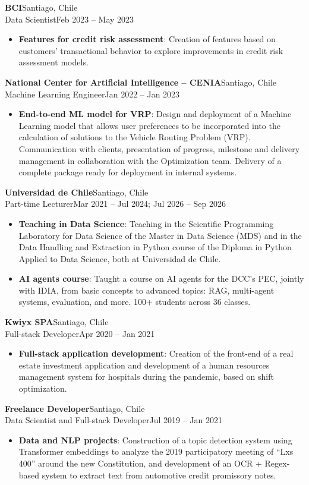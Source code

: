 \documentclass[letterpaper,11pt]{article}
\newcommand{\resumeItem}[2]{
  \item\small{
    \textbf{#1}{: #2\vspace{-2pt}}
  }
}
\newcommand{\resumeSubheading}[4]{%
  \Needspace{7\baselineskip}\vspace{-1pt}\item[]%
    \textbf{#1}\hfill{\small\color{meta}#2}\\[1pt]
    {\small #3}\hfill{\small\color{meta}#4}\vspace{-5pt}%
}
\newcommand{\resumeItemListStart}{\begin{itemize}}
\newcommand{\resumeItemListEnd}{\end{itemize}\vspace{-5pt}}
\begin{document}
    \resumeSubheading
      {BCI}{Santiago, Chile}
      {Data Scientist}{Feb 2023 -- May 2023}
      \resumeItemListStart
        \resumeItem{Features for credit risk assessment}
          {Creation of features based on customers' transactional behavior to explore improvements in credit risk assessment models.}
      \resumeItemListEnd

    \resumeSubheading
      {National Center for Artificial Intelligence -- CENIA}{Santiago, Chile}
      {Machine Learning Engineer}{Jan 2022 -- Jan 2023}
      \resumeItemListStart
        \resumeItem{End-to-end ML model for VRP}
          {Design and deployment of a Machine Learning model that allows user preferences to be incorporated into the calculation of solutions to the Vehicle Routing Problem (VRP). Communication with clients, presentation of progress, milestone and delivery management in collaboration with the Optimization team. Delivery of a complete package ready for deployment in internal systems.}
      \resumeItemListEnd

    \resumeSubheading
      {Universidad de Chile}{Santiago, Chile}
      {Part-time Lecturer}{Mar 2021 -- Jul 2024; Jul 2026 -- Sep 2026}
      \resumeItemListStart
        \resumeItem{Teaching in Data Science}
          {Teaching in the Scientific Programming Laboratory for Data Science of the Master in Data Science (MDS) and in the Data Handling and Extraction in Python course of the Diploma in Python Applied to Data Science, both at Universidad de Chile.}
        \resumeItem{AI agents course}
          {Taught a course on AI agents for the DCC's PEC, jointly with IDIA, from basic concepts to advanced topics: RAG, multi-agent systems, evaluation, and more. 100+ students across 36 classes.}
      \resumeItemListEnd

    \resumeSubheading
      {Kwiyx SPA}{Santiago, Chile}
      {Full-stack Developer}{Apr 2020 -- Jan 2021}
      \resumeItemListStart
        \resumeItem{Full-stack application development}
          {Creation of the front-end of a real estate investment application and development of a human resources management system for hospitals during the pandemic, based on shift optimization.}
      \resumeItemListEnd

    \resumeSubheading
      {Freelance Developer}{Santiago, Chile}
      {Data Scientist and Full-stack Developer}{Jul 2019 -- Jan 2021}
      \resumeItemListStart
        \resumeItem{Data and NLP projects}
          {Construction of a topic detection system using Transformer embeddings to analyze the 2019 participatory meeting of ``Lxs 400'' around the new Constitution, and development of an OCR + Regex-based system to extract text from automotive credit promissory notes.}
      \resumeItemListEnd
\end{document}
